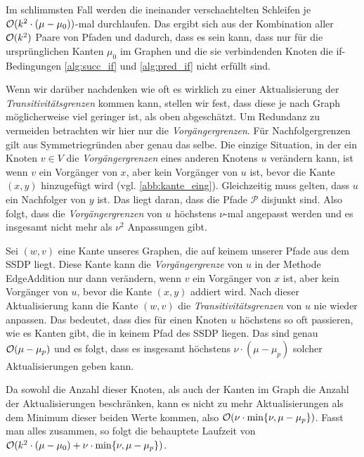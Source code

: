 \begin{beweis}
	Im schlimmsten Fall werden die ineinander verschachtelten Schleifen je $\mathcal{O}(k^2 \cdot (\mu - \mu_0))$-mal durchlaufen. Das ergibt sich aus der Kombination aller $\mathcal{O}(k^2)$ Paare von Pfaden und dadurch, dass es sein kann, dass nur für die ursprünglichen Kanten $\mu_0$ im Graphen und die sie verbindenden Knoten die if-Bedingungen \ref{alg:succ_if} und \ref{alg:pred_if} nicht erfüllt sind. 
	
	Wenn wir darüber nachdenken wie oft es wirklich zu einer Aktualisierung der \emph{Transitivitätsgrenzen} kommen kann, stellen wir fest, dass diese je nach Graph möglicherweise viel geringer ist, als oben abgeschätzt. Um Redundanz zu vermeiden betrachten wir hier nur die \emph{Vorgängergrenzen}. Für Nachfolgergrenzen gilt aus Symmetriegründen aber genau das selbe. Die einzige Situation, in der ein Knoten $v \in V$ die \emph{Vorgängergrenzen} eines anderen Knotens $u$ verändern kann, ist wenn $v$ ein Vorgänger von $x$, aber kein Vorgänger von $u$ ist, bevor die Kante $(x,y)$ hinzugefügt wird (vgl. \ref{abb:kante_eing}). Gleichzeitig muss gelten, dass $u$ ein Nachfolger von $y$ ist. Das liegt daran, dass die Pfade $\mathcal{P}$ disjunkt sind. Also folgt, dass die \emph{Vorgängergrenzen} von $u$ höchstens $\nu$-mal angepasst werden und es insgesamt nicht mehr als $\nu^2$ Anpassungen gibt. 

	Sei $(w,v)$ eine Kante unseres Graphen, die auf keinem unserer Pfade aus dem SSDP liegt. Diese Kante kann die \emph{Vorgängergrenze} von $u$ in der Methode \textrm{EdgeAddition} nur dann verändern, wenn $v$ ein Vorgänger von $x$ ist, aber kein Vorgänger von $u$, bevor die Kante $(x,y)$ addiert wird. Nach dieser Aktualisierung kann die Kante $(w,v)$ die \emph{Transitivitätsgrenzen} von $u$ nie wieder anpassen. Das bedeutet, dass dies für einen Knoten $u$ höchstens so oft passieren, wie es Kanten gibt, die in keinem Pfad des SSDP liegen. Das sind genau $\mathcal{O}(\mu - \mu_p)$ und es folgt, dass es insgesamt höchstens $\nu \cdot (\mu - \mu_p)$ solcher Aktualisierungen geben kann.
	
	Da sowohl die Anzahl dieser Knoten, als auch der Kanten im Graph die Anzahl der Aktualisierungen beschränken, kann es nicht zu mehr Aktualisierungen als dem Minimum dieser beiden Werte kommen, also $\mathcal{O}(\nu \cdot \min\{\nu, \mu - \mu_p\})$. Fasst man alles zusammen, so folgt die behauptete Laufzeit von $\mathcal{O}(k^2 \cdot (\mu - \mu_0) + \nu \cdot \min\{\nu, \mu - \mu_p\})$.
\end{beweis}

